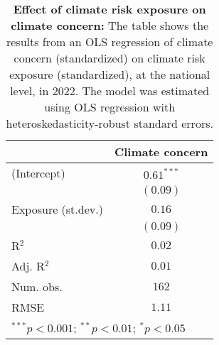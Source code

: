 
\begin{table}[!htpb]
\begin{center}
\begin{tabular}{l c}
\hline
 & Climate concern \\
\hline
(Intercept)        & $0.61^{***}$ \\
                   & $(0.09)$     \\
Exposure (st.dev.) & $0.16$       \\
                   & $(0.09)$     \\
\hline
R$^2$              & $0.02$       \\
Adj. R$^2$         & $0.01$       \\
Num. obs.          & $162$        \\
RMSE               & $1.11$       \\
\hline
\multicolumn{2}{l}{\scriptsize{$^{***}p<0.001$; $^{**}p<0.01$; $^{*}p<0.05$}}
\end{tabular}
\caption{{ \bf Effect of climate risk exposure on climate concern:} The table shows the results from an OLS regression of climate concern (standardized) on climate risk exposure (standardized), at the national level, in 2022. The model was estimated using OLS regression with heteroskedasticity-robust standard errors.}
\label{tab:regressionsimple}
\end{center}
\end{table}
